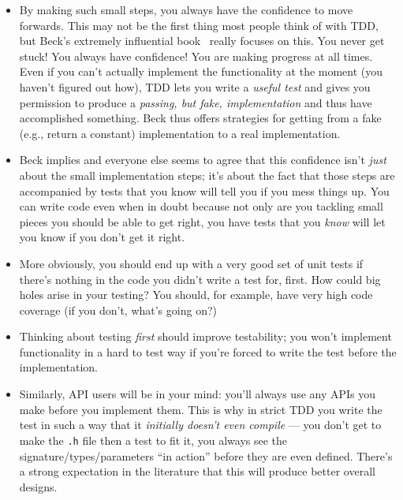 \documentclass[sigplan,screen]{acmart}
\begin{document}
\begin{itemize}
  \item By making such small steps, you always have the confidence to
    move forwards.  This may not be the first thing most people think
    of with TDD, but Beck's extremely influential book~\cite{beck2002test} really focuses
    on this.  You never get stuck!  You always have confidence!  You
    are making progress at all times.  Even if you can't actually
    implement the functionality at the moment (you haven't figured out
    how), TDD lets you write a \emph{useful test} and gives you
    permission to produce a \emph{passing,
      but fake, implementation} and thus have accomplished something.
    Beck thus offers strategies for getting from a fake (e.g., return a
    constant) implementation to a real implementation.
    \item Beck implies and everyone else seems to agree that this
      confidence isn't \emph{just} about the small implementation steps; it's about
      the fact that those steps are accompanied by tests that you know
      will tell you if you mess things up.  You can write code even
      when in doubt because not only are you tackling small pieces you
      should be able to get right, you have tests that you \emph{know}
      will let you know if you don't get it right.
      \item More obviously, you should end up with a very good set of unit
        tests if there's nothing in the code you didn't write a test
        for, first.  How could big holes arise in your testing?  You
        should, for example, have very high code coverage (if you
        don't, what's going on?)
        \item Thinking about testing \emph{first} should improve
          testability; you won't implement functionality in a hard to
          test way if you're forced to write the test before the
          implementation.
          \item Similarly, API users will be in your mind: you'll
            always use any APIs you make before you implement them.
            This is why in strict TDD you write the test in such a way
            that it \emph{initially doesn't even compile} --- you
            don't get to make the {\tt .h} file then a test to fit it,
            you always see the signature/types/parameters ``in action''
            before they are even defined.
            There's a strong expectation in the literature that this
            will produce better overall designs.
            \end{itemize}
\end{document}

